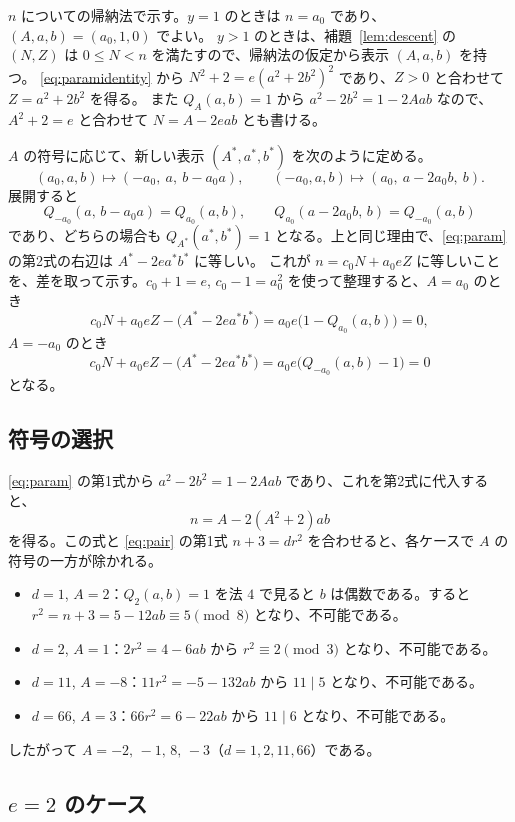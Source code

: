 \documentclass[a4paper,11pt]{ltjsarticle}
\makeatletter
\theoremstyle{jplain}
\renewcommand{\proofname}{証明}
\renewenvironment{proof}[1][\proofname]{\par\pushQED{\qed}\normalfont\topsep6\p@\@plus6\p@\relax
  \trivlist\item[\hskip\labelsep\bfseries #1]\ignorespaces}{\popQED\endtrivlist\@endpefalse}
\numberwithin{equation}{section}
\numberwithin{table}{section}
\newcommand{\tsec}[2]{\texorpdfstring{#1}{#2}}
\makeatother
\begin{document}
\begin{proof}
$n$ についての帰納法で示す。$y=1$ のときは $n=a_0$ であり、$(A,a,b)=(a_0,1,0)$ でよい。
$y>1$ のときは、補題~\ref{lem:descent} の $(N,Z)$ は $0\le N<n$ を満たすので、帰納法の仮定から表示 $(A,a,b)$ を持つ。
\eqref{eq:paramidentity} から $N^2+2=e(a^2+2b^2)^2$ であり、$Z>0$ と合わせて $Z=a^2+2b^2$ を得る。
また $Q_A(a,b)=1$ から $a^2-2b^2=1-2Aab$ なので、$A^2+2=e$ と合わせて $N=A-2eab$ とも書ける。

$A$ の符号に応じて、新しい表示 $(A^*,a^*,b^*)$ を次のように定める。
\[
(a_0,a,b)\mapsto(-a_0,\ a,\ b-a_0a),\qquad(-a_0,a,b)\mapsto(a_0,\ a-2a_0b,\ b).
\]
展開すると
\[
Q_{-a_0}(a,\,b-a_0a)=Q_{a_0}(a,b),\qquad Q_{a_0}(a-2a_0b,\,b)=Q_{-a_0}(a,b)
\]
であり、どちらの場合も $Q_{A^*}(a^*,b^*)=1$ となる。上と同じ理由で、\eqref{eq:param} の第2式の右辺は $A^*-2ea^*b^*$ に等しい。
これが $n=c_0N+a_0eZ$ に等しいことを、差を取って示す。$c_0+1=e$, $c_0-1=a_0^2$ を使って整理すると、$A=a_0$ のとき
\[
c_0N+a_0eZ-\bigl(A^*-2ea^*b^*\bigr)=a_0e\bigl(1-Q_{a_0}(a,b)\bigr)=0,
\]
$A=-a_0$ のとき
\[
c_0N+a_0eZ-\bigl(A^*-2ea^*b^*\bigr)=a_0e\bigl(Q_{-a_0}(a,b)-1\bigr)=0
\]
となる。
\end{proof}

\subsection{符号の選択}

\eqref{eq:param} の第1式から $a^2-2b^2=1-2Aab$ であり、これを第2式に代入すると、
\begin{equation}\label{eq:offset}
n=A-2(A^2+2)ab
\end{equation}
を得る。この式と \eqref{eq:pair} の第1式 $n+3=dr^2$ を合わせると、各ケースで $A$ の符号の一方が除かれる。
\begin{itemize}
\item $d=1$, $A=2$：$Q_2(a,b)=1$ を法 $4$ で見ると $b$ は偶数である。すると $r^2=n+3=5-12ab\equiv5\pmod8$ となり、不可能である。
\item $d=2$, $A=1$：$2r^2=4-6ab$ から $r^2\equiv2\pmod3$ となり、不可能である。
\item $d=11$, $A=-8$：$11r^2=-5-132ab$ から $11\mid5$ となり、不可能である。
\item $d=66$, $A=3$：$66r^2=6-22ab$ から $11\mid6$ となり、不可能である。
\end{itemize}
したがって $A=-2,\,-1,\,8,\,-3$（$d=1,2,11,66$）である。

\subsection{\tsec{$e=2$}{e=2} のケース}
\end{document}
